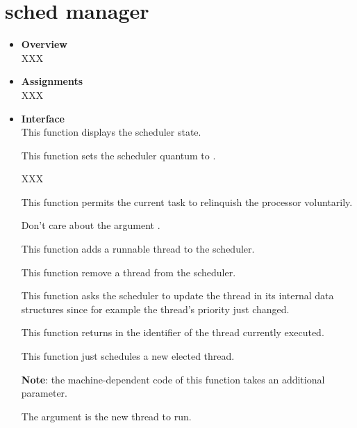 \section{\textbf{sched} manager}
\begin{itemize}
  \item {\bf Overview}\\

    XXX

  \item {\bf Assignments}\\

    XXX

  \item {\bf Interface}\\

	 {
	   This function displays the scheduler state.
	 }

	 {
	   This function sets the scheduler quantum to .

	   XXX
	 }

	 {
	   This function permits the current task to relinquish
	   the processor voluntarily.

	   Don't care about the argument .
	 }

	 {
	   This function adds a runnable thread to the scheduler.
	 }

	 {
	   This function remove a thread from the scheduler.
	 }

	 {
	   This function asks the scheduler to update the thread
	    in its internal data structures since
	   for example the thread's priority just changed.
	 }

	 {
	   This function returns in  the identifier
	   of the thread currently executed.
	 }

	 {
	   This function just schedules a new elected thread.

	   \textbf{Note}: the machine-dependent code of this function
	   takes an additional parameter.

		    {
		      The argument  is the new
		      thread to run.
		    }
	 }


\end{itemize}
